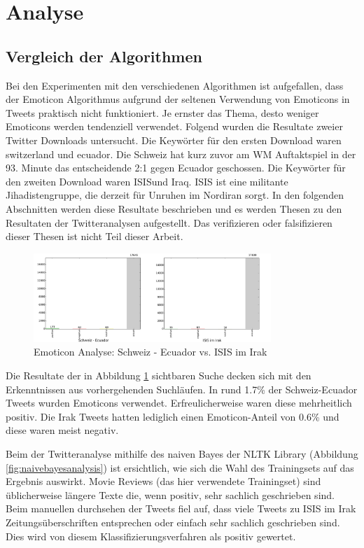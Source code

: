 \clearpage
\section{Analyse}
\subsection{Vergleich der Algorithmen}
Bei den Experimenten mit den verschiedenen Algorithmen ist aufgefallen, dass der Emoticon Algorithmus aufgrund der seltenen Verwendung von Emoticons in Tweets praktisch nicht funktioniert. Je ernster das Thema, desto weniger Emoticons werden tendenziell verwendet. Folgend wurden die Resultate zweier Twitter Downloads untersucht. Die Keywörter für den ersten Download waren \flqq switzerland \frqq und \flqq ecuador\frqq. Die Schweiz hat kurz zuvor am WM Auftaktspiel in der 93. Minute das entscheidende 2:1 gegen Ecuador geschossen. Die Keywörter für den zweiten Download waren \flqq ISIS\frqq und \flqq Iraq\flqq. ISIS ist eine militante Jihadistengruppe, die derzeit für Unruhen im Nordiran sorgt. \cite{isis} In den folgenden Abschnitten werden diese Resultate beschrieben und es werden Thesen zu den Resultaten der Twitteranalysen aufgestellt. Das verifizieren oder falsifizieren dieser Thesen ist nicht Teil dieser Arbeit.

\begin{figure}[h]
  \centering
  \includegraphics[width=0.8\textwidth]{images/schweizvsirak_emoticon.pdf}
  \caption[Emoticon Analyse: Schweiz - Ecuador vs. ISIS im Irak]{Emoticon Analyse: Schweiz - Ecuador vs. ISIS im Irak}
  \label{fig:emoticonanalysis}
\end{figure}

Die Resultate der in Abbildung \ref{fig:emoticonanalysis} sichtbaren Suche decken sich mit den Erkenntnissen aus vorhergehenden Suchläufen. In rund 1.7\% der Schweiz-Ecuador Tweets wurden Emoticons verwendet. Erfreulicherweise waren diese mehrheitlich positiv. Die Irak Tweets hatten lediglich einen Emoticon-Anteil von 0.6\% und diese waren meist negativ.

Beim der Twitteranalyse mithilfe des naiven Bayes der NLTK Library (Abbildung \ref{fig:naivebayesanalysis}) ist ersichtlich, wie sich die Wahl des Trainingsets auf das Ergebnis auswirkt. Movie Reviews (das hier verwendete Trainingset) sind üblicherweise längere Texte die, wenn positiv, sehr sachlich geschrieben sind. Beim manuellen durchsehen der Tweets fiel auf, dass viele Tweets zu ISIS im Irak Zeitungsüberschriften entsprechen oder einfach sehr sachlich geschrieben sind. Dies wird von diesem Klassifizierungsverfahren als positiv gewertet.

